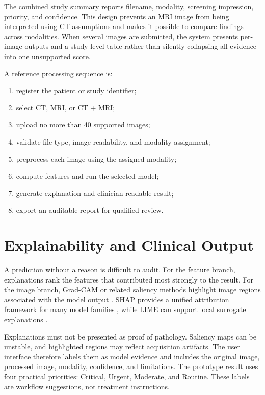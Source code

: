 \documentclass[10pt,a4paper]{article}
\begin{document}
The combined study summary reports filename, modality, screening impression, priority, and confidence. This design prevents an MRI image from being interpreted using CT assumptions and makes it possible to compare findings across modalities. When several images are submitted, the system presents per-image outputs and a study-level table rather than silently collapsing all evidence into one unsupported score.

A reference processing sequence is:
\begin{enumerate}[leftmargin=*,nosep]
\item register the patient or study identifier;
\item select CT, MRI, or CT + MRI;
\item upload no more than 40 supported images;
\item validate file type, image readability, and modality assignment;
\item preprocess each image using the assigned modality;
\item compute features and run the selected model;
\item generate explanation and clinician-readable result;
\item export an auditable report for qualified review.
\end{enumerate}

\section{Explainability and Clinical Output}
A prediction without a reason is difficult to audit. For the feature branch, explanations rank the features that contributed most strongly to the result. For the image branch, Grad-CAM or related saliency methods highlight image regions associated with the model output \citep{selvaraju2017}. SHAP provides a unified attribution framework for many model families \citep{lundberg2017}, while LIME can support local surrogate explanations \citep{ribeiro2016}.

Explanations must not be presented as proof of pathology. Saliency maps can be unstable, and highlighted regions may reflect acquisition artifacts. The user interface therefore labels them as model evidence and includes the original image, processed image, modality, confidence, and limitations. The prototype result uses four practical priorities: Critical, Urgent, Moderate, and Routine. These labels are workflow suggestions, not treatment instructions.
\end{document}
